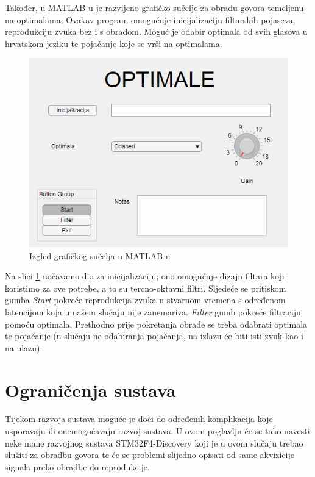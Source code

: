 \documentclass[times, utf8, diplomski]{fer}
\begin{document}
Također, u MATLAB-u je razvijeno grafičko sučelje za obradu govora temeljenu na optimalama. Ovakav program omogućuje inicijalizaciju filtarskih pojaseva, reprodukciju zvuka bez i s obradom. Moguć je odabir optimala od svih glasova u hrvatskom jeziku te pojačanje koje se vrši na optimalama.

\begin{figure}[hbt!]
\label{gui}
 \centering
 \includegraphics[scale=0.5]{photos/gui.png}
 \caption{Izgled grafičkog sučelja u MATLAB-u}
\end{figure}

Na slici \ref{gui} uočavamo dio za inicijalizaciju; ono omogućuje dizajn filtara koji koristimo za ove potrebe, a to su tercno-oktavni filtri. Sljedeće se pritiskom gumba \textit{Start} pokreće reprodukcija zvuka u stvarnom vremena s određenom latencijom koja u našem slučaju nije zanemariva. \textit{Filter} gumb pokreće filtraciju pomoću optimala. Prethodno prije pokretanja obrade se treba odabrati optimala te pojačanje (u slučaju ne odabiranja pojačanja, na izlazu će biti isti zvuk kao i na ulazu). 

\section{Ograničenja sustava}
Tijekom razvoja sustava moguće je doći do određenih komplikacija koje usporavaju ili onemogućavaju razvoj sustava. U ovom poglavlju će se tako navesti neke mane razvojnog sustava STM32F4-Discovery koji je u ovom slučaju trebao služiti za obradbu govora te će se problemi slijedno opisati od same akvizicije signala preko obradbe do reprodukcije.
\end{document}
